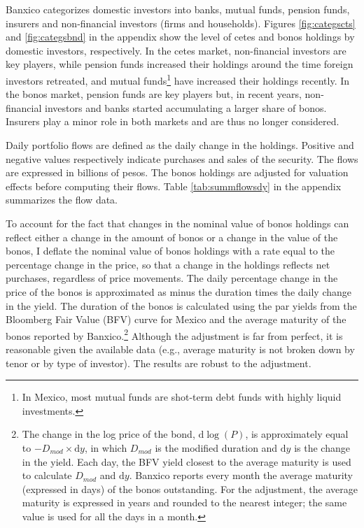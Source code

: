 \documentclass[a4paper, 12pt]{article}
\begin{document}
Banxico categorizes domestic investors into banks, mutual funds, pension funds, insurers and non-financial investors (firms and households). 
Figures \ref{fig:categscts} and \ref{fig:categsbnd} in the appendix show the level of cetes and bonos holdings by domestic investors, respectively. 
In the cetes market, non-financial investors are key players, while pension funds increased their holdings around the time foreign investors retreated, and mutual funds\footnote{In Mexico, most mutual funds are shot-term debt funds with highly liquid investments.} 
have increased their holdings recently. 
In the bonos market, pension funds are key players but, in recent years, non-financial investors and banks started accumulating a larger share of bonos. 
Insurers play a minor role in both markets and are thus no longer considered.

Daily portfolio flows are defined as the daily change in the holdings. 
Positive and negative values respectively indicate purchases and sales of the security.
The flows are expressed in billions of pesos. The bonos holdings are adjusted for valuation effects before computing their flows. Table \ref{tab:summflowsdy} in the appendix summarizes the flow data. 

To account for the fact that changes in the nominal value of bonos holdings can reflect either a change in the amount of bonos or a change in the value of the bonos, I deflate the nominal value of bonos holdings with a rate equal to the percentage change in the price, so that a change in the holdings reflects net purchases, regardless of price movements.
The daily percentage change in the price of the bonos is approximated as minus the duration times the daily change in the yield. 
The duration of the bonos is calculated using the par yields from the Bloomberg Fair Value (BFV) curve for Mexico and the average maturity of the bonos reported by Banxico.\footnote{The change in the log price of the bond, \(\mathrm{d}\log (P)\), is approximately equal to \(- D_{mod} \times \mathrm{d} y\), in which \(D_{mod}\) is the modified duration and \(\mathrm{d} y\) is the change in the yield. Each day, the BFV yield closest to the average maturity is used to calculate \(D_{mod}\) and \(\mathrm{d} y\). Banxico reports every month the average maturity (expressed in days) of the bonos outstanding. For the adjustment, the average maturity is expressed in years and rounded to the nearest integer; the same value is used for all the days in a month.} 
Although the adjustment is far from perfect, it is reasonable given the available data (e.g., average maturity is not broken down by tenor or by type of investor). 
The results are robust to the adjustment.
\end{document}
